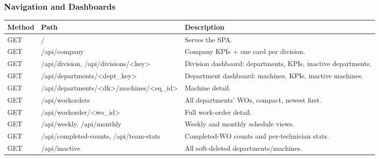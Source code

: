\documentclass[11pt,a4paper]{article}
\newcommand{\sbrk}{\hspace{0pt}}
\begin{document}
\subsubsection{Navigation and Dashboards}
\begin{longtable}{@{}p{}>{\ttfamily\small}p{}p{}@{}}
\toprule
\textbf{Method} & \textbf{Path} & \textbf{Description} \\
\midrule
\endhead
GET & /\sbrk & Serves the SPA. \\
GET & /\sbrk api/\sbrk company & Company KPIs + one card per division. \\
GET & /\sbrk api/\sbrk division, /\sbrk api/\sbrk divisions/\sbrk <key> & Division dashboard: departments, KPIs, inactive departments. \\
GET & /\sbrk api/\sbrk departments/\sbrk <dept\_key> & Department dashboard: machines, KPIs, inactive machines. \\
GET & /\sbrk api/\sbrk departments/\sbrk <dk>/\sbrk machines/\sbrk <eq\_id> & Machine detail. \\
GET & /\sbrk api/\sbrk workorders & All departments' WOs, compact, newest first. \\
GET & /\sbrk api/\sbrk workorder/\sbrk <wo\_id> & Full work-order detail. \\
GET & /\sbrk api/\sbrk weekly, /\sbrk api/\sbrk monthly & Weekly and monthly schedule views. \\
GET & /\sbrk api/\sbrk completed-counts, /\sbrk api/\sbrk team-stats & Completed-WO counts and per-technician stats. \\
GET & /\sbrk api/\sbrk inactive & All soft-deleted departments/machines. \\
\bottomrule
\end{longtable}
\end{document}
